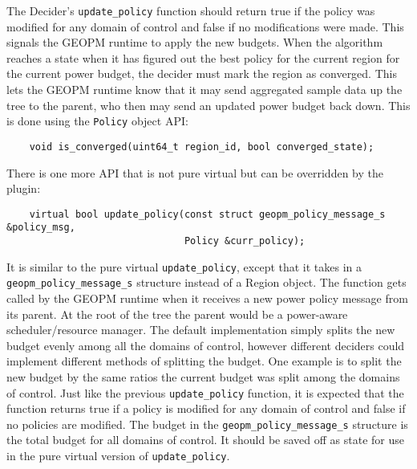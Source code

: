 \documentclass[11pt]{article}
\begin{document}
The Decider's \verb#update_policy# function should return true if the policy was
modified for any domain of control and false if no modifications were
made. This signals the GEOPM runtime to apply the new budgets.  When
the algorithm reaches a state when it has figured out the best policy
for the current region for the current power budget, the decider must
mark the region as converged. This lets the GEOPM runtime know that it
may send aggregated sample data up the tree to the parent, who then
may send an updated power budget back down. This is done using the
\verb#Policy# object API:
\begin{verbatim}
    void is_converged(uint64_t region_id, bool converged_state);
\end{verbatim}
There is one more API that is not pure virtual but can be overridden
by the plugin:
\begin{verbatim}
    virtual bool update_policy(const struct geopm_policy_message_s &policy_msg,
                               Policy &curr_policy);
\end{verbatim}
It is similar to the pure virtual \verb#update_policy#, except that it
takes in a \verb#geopm_policy_message_s# structure instead of a Region
object. The function gets called by the GEOPM runtime when it receives
a new power policy message from its parent. At the root of the tree
the parent would be a power-aware scheduler/resource manager. The
default implementation simply splits the new budget evenly among all
the domains of control, however different deciders could implement
different methods of splitting the budget. One example is to split the
new budget by the same ratios the current budget was split among the
domains of control. Just like the previous \verb#update_policy#
function, it is expected that the function returns true if a policy is
modified for any domain of control and false if no policies are
modified. The budget in the \verb#geopm_policy_message_s# structure is
the total budget for all domains of control. It should be saved off as
state for use in the pure virtual version of \verb#update_policy#.
\end{document}
